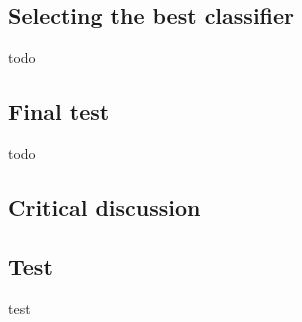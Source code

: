 \documentclass[letterpaper,12pt]{article}
\begin{document}
\subsection{Selecting the best classifier}

todo

\subsection{Final test}

todo

\subsection{Critical discussion}



\begin{appendices}

\clearpage





\clearpage
\section{Test}
\label{sec:appendix-demo-figure}

test


\end{appendices}
\end{document}
